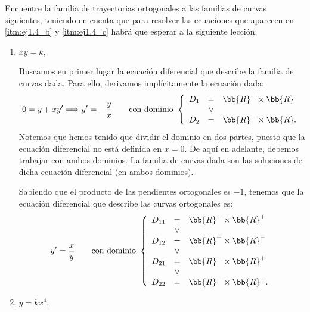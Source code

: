 \begin{ejercicio}
    Encuentre la familia de trayectorias ortogonales a las familias de curvas siguientes, teniendo en cuenta que para resolver las ecuaciones que aparecen en \ref{itm:ej1.4_b} y \ref{itm:ej1.4_c} habrá que esperar a la siguiente lección:
    \begin{enumerate}
        \item \(xy = k\),
        
        Buscamos en primer lugar la ecuación diferencial que describe la familia de curvas dada. Para ello, derivamos implícitamente la ecuación dada:
        \begin{equation*}
            0 = y + xy' \Longrightarrow y' = -\dfrac{y}{x}\qquad \text{con dominio } \left\{\begin{array}{rcl}
                D_1&=&\bb{R}^+\times \bb{R}\\
                &\lor& \\
                D_2&=&\bb{R}^-\times \bb{R}.\\
            \end{array}\right.
        \end{equation*}
        Notemos que hemos tenido que dividir el dominio en dos partes, puesto que la ecuación diferencial no está definida en $x=0$.
        De aquí en adelante, debemos trabajar con ambos dominios. La familia de curvas dada son las soluciones de dicha ecuación diferencial (en ambos dominios).

        Sabiendo que el producto de las pendientes ortogonales es $-1$, tenemos que la ecuación diferencial que describe las curvas ortogonales es:
        \begin{equation*}
            y' = \dfrac{x}{y} \qquad \text{con dominio } \left\{\begin{array}{rcl}
                D_{11}&=&\bb{R}^+\times \bb{R}^+\\
                &\lor& \\
                D_{12}&=&\bb{R}^+\times \bb{R}^-\\
                &\lor& \\
                D_{21}&=&\bb{R}^-\times \bb{R}^+\\
                &\lor& \\
                D_{22}&=&\bb{R}^-\times \bb{R}^-.
            \end{array}\right.
        \end{equation*}
        
        \item\label{itm:ej1.4_b} \(y = kx^4\),
        

\end{enumerate}
\end{ejercicio}
